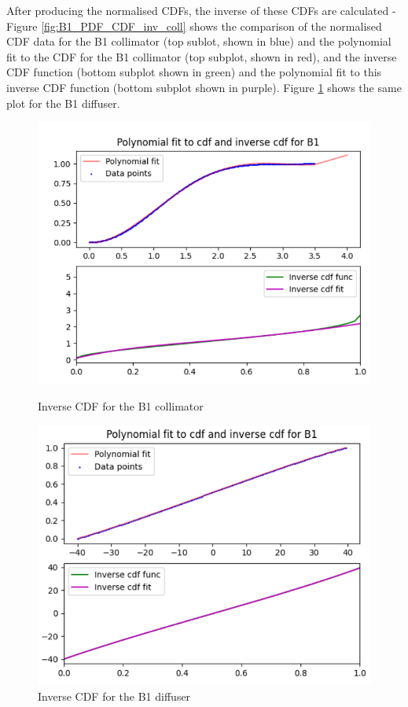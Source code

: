 After producing the normalised CDFs, the inverse of these CDFs are calculated - Figure \ref{fig:B1_PDF_CDF_inv_coll} shows the comparison of the normalised CDF data for the B1 collimator (top sublot, shown in blue) and the polynomial fit to the CDF for the B1 collimator (top subplot, shown in red), and the inverse CDF function (bottom subplot shown in green) and the polynomial fit to this inverse CDF function (bottom subplot shown in purple). Figure \ref{fig:B1_PDF_CDF_inv_diff} shows the same plot for the B1 diffuser. 

\begin{figure}
    \centering
    \begin{minipage}{0.5\textwidth}
        \centering
        \includegraphics[width=\textwidth]{Figures/B1_inv_coll_cdf.png} %
        \caption{Inverse CDF for the B1 collimator}
        \label{fig:B1_PDF_CDF_inv_coll}
    \end{minipage}\hfill
    \begin{minipage}{0.5\textwidth}
        \centering
        \includegraphics[width=\textwidth]{Figures/B1_inv_diff_cdf.png} %
        \caption{Inverse CDF for the B1 diffuser}
        \label{fig:B1_PDF_CDF_inv_diff}
    \end{minipage}
\end{figure}



